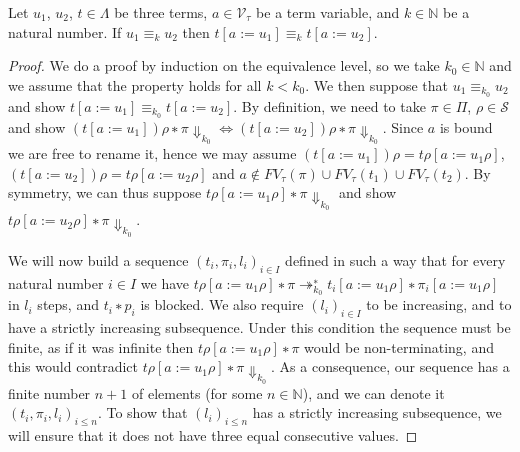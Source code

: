 \begin{lemma}\label{afullextlem}%
  Let $u_1$, $u_2$, $t ∈ Λ$ be three terms, $a ∈ \mathcal{V}_τ$ be a term
  variable, and $k ∈ \mathbb{N}$ be a natural number. If $u_1 ≡_k u_2$ then
  ${t[a := u_1]} ≡_k {t[a := u_2]}$.
\end{lemma}
\begin{proof}
  We do a proof by induction on the equivalence level, so we take $k_0 ∈
  \mathbb{N}$ and we assume that the property holds for all $k < k_0$. We
  then suppose that $u_1 ≡_{k_0} u_2$ and show ${t[a := u_1]} ≡_{k_0}
  {t[a := u_2]}$. By definition, we need to take $π ∈ Π$, $ρ ∈ \mathcal{S}$
  and show ${{(t[a := u_1])ρ∗π} {⇓}_{k_0}} ⇔ {{(t[a := u_2])ρ∗π} {⇓}_{k_0}}$.
  Since $a$ is bound we are free to rename it, hence we may assume
  ${(t[a := u_1])ρ} = {tρ[a := u_1ρ]}$, ${(t[a := u_2])ρ} = {tρ[a := u_2ρ]}$
  and $a ∉ FV_τ(π) ∪ FV_τ(t_1) ∪ FV_τ(t_2)$. By symmetry, we can thus
  suppose ${tρ[a := u_1ρ] ∗ π} {⇓}_{k_0}$ and show
  ${tρ[a := u_2ρ] ∗ π} {⇓}_{k_0}$.

  We will now build a sequence $(t_i,π_i,l_i)_{i ∈ I}$ defined in such
  a way that for every natural number $i ∈ I$ we have ${tρ[a := u_1ρ] ∗ π}
  ↠_{k_0}^{∗} {t_i[a := u_1ρ] ∗ π_i[a := u_1ρ]}$ in $l_i$ steps, and
  $t_i ∗ p_i$ is blocked. We also require $(l_i)_{i ∈ I}$ to be increasing,
  and to have a strictly increasing subsequence. Under this condition the
  sequence must be finite, as if it was infinite then $tρ[a := u_1ρ]∗π$
  would be non-terminating, and this would contradict ${tρ[a := u_1ρ]∗π}
  {⇓}_{k_0}$. As a consequence, our sequence has a finite number $n+1$ of
  elements (for some $n ∈ \mathbb{N}$), and we can denote it
  $(t_i,π_i,l_i)_{i ≤ n}$. To show that $(l_i)_{i ≤ n}$ has a strictly
  increasing subsequence, we will ensure that it does not have three equal
  consecutive values.


\end{proof}
